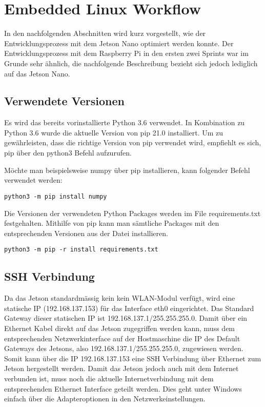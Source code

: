 \newpage

\section{Embedded Linux Workflow}
In den nachfolgenden Abschnitten wird kurz vorgestellt, wie der Entwicklungsprozess mit dem Jetson Nano optimiert werden konnte. Der Entwicklungsprozess mit dem Raspberry Pi in den ersten zwei Sprints war im Grunde sehr ähnlich, die nachfolgende Beschreibung bezieht sich jedoch lediglich auf das Jetson Nano.

\subsection{Verwendete Versionen}
Es wird das bereits vorinstallierte Python 3.6 verwendet. In Kombination zu Python 3.6 wurde die aktuelle Version von pip 21.0 installiert. Um zu gewährleisten, dass die richtige Version von pip verwendet wird, empfiehlt es sich, pip über den python3 Befehl aufzurufen.

Möchte man beispielsweise numpy über pip installieren, kann folgender Befehl verwendet werden:
\begin{verbatim}
python3 -m pip install numpy
\end{verbatim}

Die Versionen der verwendeten Python Packages werden im File requirements.txt festgehalten. Mithilfe von pip kann man sämtliche Packages mit den entsprechenden Versionen aus der Datei installieren.

\begin{verbatim}
python3 -m pip -r install requirements.txt
\end{verbatim}

\subsection{SSH Verbindung}
Da das Jetson standardmässig kein kein WLAN-Modul verfügt, wird eine statische IP (192.168.137.153) für das Interface eth0 eingerichtet. Das Standard Gateway dieser statischen IP ist 192.168.137.1/255.255.255.0. Damit über ein Ethernet Kabel direkt auf das Jetson zugegriffen werden kann, muss dem entsprechenden Netzwerkinterface auf der Hostmaschine die IP des Default Gateways des Jetsons, also 192.168.137.1/255.255.255.0, zugewiesen werden. Somit kann über die IP 192.168.137.153 eine SSH Verbindung über Ethernet zum Jetson hergestellt werden. Damit das Jetson jedoch auch mit dem Internet verbunden ist, muss noch die aktuelle Internetverbindung mit dem entsprechenden Ethernet Interface geteilt werden. Dies geht unter Windows einfach über die Adapteroptionen in den Netzwerkeinstellungen.

